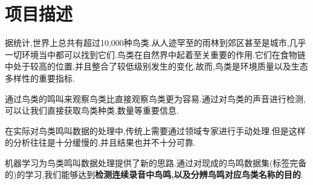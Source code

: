 \section{项目描述}
据统计,世界上总共有超过10,000种鸟类.从人迹罕至的雨林到郊区甚至是城市,几乎一切环境当中都可以找到它们.鸟类在自然界中起着至关重要的作用.它们在食物链中处于较高的位置,并且整合了较低级别发生的变化.故而,鸟类是环境质量以及生态多样性的重要指标.

通过鸟类的鸣叫来观察鸟类比直接观察鸟类更为容易.通过对鸟类的声音进行检测,可以让我们直接获取鸟类种类,数量等重要信息.

在实际对鸟类鸣叫数据的处理中,传统上需要通过领域专家进行手动处理.但是这样的分析往往是十分缓慢的,并且结果也并不十分可靠.

机器学习为鸟类鸣叫数据处理提供了新的思路.通过对现成的鸟鸣数据集(标签完备的)的学习,我们能够达到\textbf{检测连续录音中鸟鸣,以及分辨鸟鸣对应鸟类名称的目的}.


